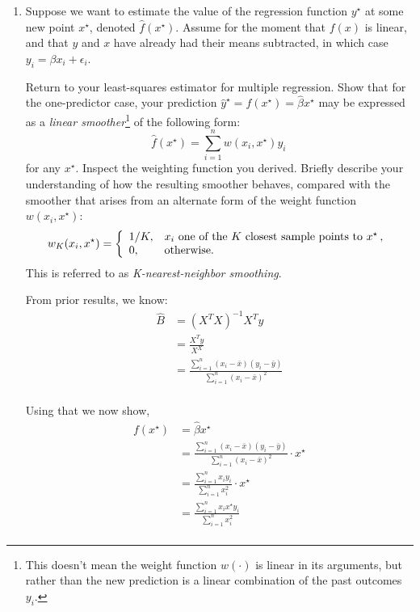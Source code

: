 \documentclass{homework}
\begin{document}
\begin{enumerate}[label=(\Alph*)]
\item Suppose we want to estimate the value of the regression function $y^{\star}$ at some new point $x^\star$, denoted $\hat{f}(x^{\star})$.  Assume for the moment that $f(x)$ is linear, and that $y$ and $x$ have already had their means subtracted, in which case $y_i = \beta x_i + \epsilon_i$.

Return to your least-squares estimator for multiple regression.  Show that for the one-predictor case, your prediction $\hat{y}^{\star} = f(x^{\star}) = \hat{\beta} x^{\star}$ may be expressed as a \textit{linear smoother}\footnote{This doesn't mean the weight function $w(\cdot)$ is linear in its arguments, but rather than the new prediction is a linear combination of the past outcomes $y_i$.} of the following form:
$$
\hat{f}(x^{\star}) =  \sum_{i=1}^n w(x_i, x^{\star}) y_i   \, 
$$
for any $x^{\star}$.  Inspect the weighting function you derived.  Briefly describe your understanding of how the resulting smoother behaves, compared with the smoother that arises from an alternate form of the weight function $w(x_i, x^{\star})$:
$$
w_K(x_i, x^{\star}) = \left \{
\begin{array}{l l}
1/K, & \mbox{$x_i$ one of the $K$ closest sample points to $x^{\star}$} \, ,\\
0, & \mbox{otherwise.} \\
\end{array}
\right.
$$
This is referred to as \textit{K-nearest-neighbor smoothing}.
\\
\par From prior results, we know: 
\begin{equation} \begin{split}
\hat{B} &= (X^TX)^{-1}X^T y\\
&= \frac{ X^Ty }{X^X} \\
&= \frac{ \sum_{i=1}^n{(x_i - \bar{x})(y_i - \bar{y})}}{ \sum_{i=1}^n{(x_i - \bar{x})^2 }} \\
\end{split}\end{equation}

\par Using that we now show,
\begin{equation} \begin{split}
f(x^{\star}) &= \hat{\beta} x^{\star}\\
&= \frac{ \sum_{i=1}^n{(x_i - \bar{x})(y_i - \bar{y})}}{ \sum_{i=1}^n{(x_i - \bar{x})^2 }} \cdot x^{\star}\\
&= \frac{ \sum_{i=1}^n{x_i y_i }}{ \sum_{i=1}^n{x_i^2 }} \cdot x^{\star}\\
&= \frac{ \sum_{i=1}^n{x_i x^{\star} y_i }}{ \sum_{i=1}^n{x_i^2 }} \\
\end{split}\end{equation}


\end{enumerate}
\end{document}
